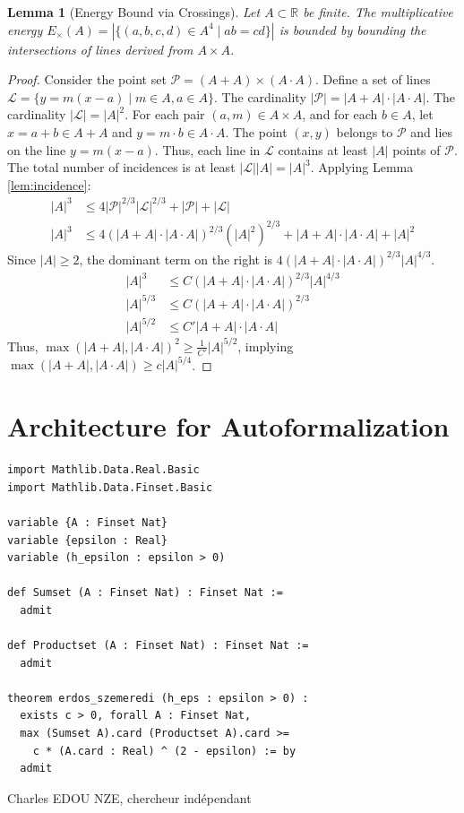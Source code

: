 \documentclass[12pt]{article}
\newtheorem{lemma}[theorem]{Lemma}
\begin{document}
\begin{lemma}[Energy Bound via Crossings]
\label{lem:energy}
Let $A \subset \mathbb{R}$ be finite. The multiplicative energy $E_{\times}(A) = |\{(a,b,c,d) \in A^4 \mid ab=cd\}|$ is bounded by bounding the intersections of lines derived from $A \times A$.
\end{lemma}

\begin{proof}
Consider the point set $\mathcal{P} = (A + A) \times (A \cdot A)$.
Define a set of lines $\mathcal{L} = \{ y = m(x - a) \mid m \in A, a \in A \}$.
The cardinality $|\mathcal{P}| = |A + A| \cdot |A \cdot A|$.
The cardinality $|\mathcal{L}| = |A|^2$.
For each pair $(a, m) \in A \times A$, and for each $b \in A$, let $x = a + b \in A + A$ and $y = m \cdot b \in A \cdot A$.
The point $(x, y)$ belongs to $\mathcal{P}$ and lies on the line $y = m(x - a)$.
Thus, each line in $\mathcal{L}$ contains at least $|A|$ points of $\mathcal{P}$.
The total number of incidences is at least $|\mathcal{L}| |A| = |A|^3$.
Applying Lemma \ref{lem:incidence}:
\begin{align*}
|A|^3 &\leq 4 |\mathcal{P}|^{2/3} |\mathcal{L}|^{2/3} + |\mathcal{P}| + |\mathcal{L}| \\
|A|^3 &\leq 4 (|A + A| \cdot |A \cdot A|)^{2/3} (|A|^2)^{2/3} + |A + A| \cdot |A \cdot A| + |A|^2
\end{align*}
Since $|A| \geq 2$, the dominant term on the right is $4 (|A + A| \cdot |A \cdot A|)^{2/3} |A|^{4/3}$.
\begin{align*}
|A|^3 &\leq C (|A + A| \cdot |A \cdot A|)^{2/3} |A|^{4/3} \\
|A|^{5/3} &\leq C (|A + A| \cdot |A \cdot A|)^{2/3} \\
|A|^{5/2} &\leq C' |A + A| \cdot |A \cdot A|
\end{align*}
Thus, $\max(|A + A|, |A \cdot A|)^2 \geq \frac{1}{C'} |A|^{5/2}$, implying $\max(|A + A|, |A \cdot A|) \geq c |A|^{5/4}$.
\end{proof}

\section{Architecture for Autoformalization}
\begin{lstlisting}
import Mathlib.Data.Real.Basic
import Mathlib.Data.Finset.Basic

variable {A : Finset Nat}
variable {epsilon : Real}
variable (h_epsilon : epsilon > 0)

def Sumset (A : Finset Nat) : Finset Nat :=
  admit

def Productset (A : Finset Nat) : Finset Nat :=
  admit

theorem erdos_szemeredi (h_eps : epsilon > 0) :
  exists c > 0, forall A : Finset Nat,
  max (Sumset A).card (Productset A).card >=
    c * (A.card : Real) ^ (2 - epsilon) := by
  admit
\end{lstlisting}

\vfill
Charles EDOU NZE, chercheur ind\'ependant
\end{document}
